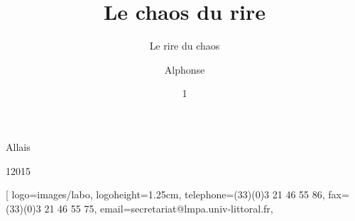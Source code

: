 %
%
\author[aa@zygo.fr]{Alphonse}{Allais}
%
\title[Laugh's Chaos]{Le chaos du rire}
%
\subtitle[Chaos' laugh]{Le rire du chaos}
%
%
%
\date{1}{1}{2015}
%
\subject[Chaotic Laugh]{Rire chaotique}
%
%
%
%
%
\laboratory[
logo=images/labo,
logoheight=1.25cm,
telephone=(33)(0)3 21 46 55 86,
fax=(33)(0)3 21 46 55 75,
email=secretariat@lmpa.univ-littoral.fr,
